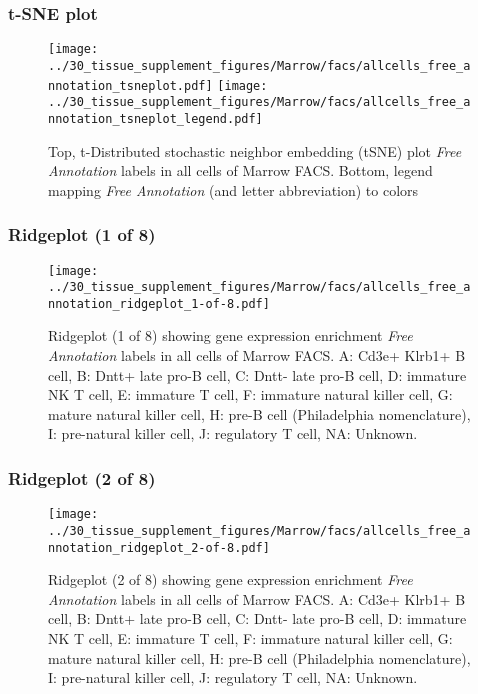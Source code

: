 \clearpage
\subsubsection{t-SNE plot}
\begin{figure}[h]
\centering
\texttt{[image: ../30\_tissue\_supplement\_figures/Marrow/facs/allcells\_free\_annotation\_tsneplot.pdf]}
\texttt{[image: ../30\_tissue\_supplement\_figures/Marrow/facs/allcells\_free\_annotation\_tsneplot\_legend.pdf]}
\caption{Top, t-Distributed stochastic neighbor embedding (tSNE) plot  \emph{Free Annotation} labels in all cells of Marrow FACS. Bottom, legend mapping \emph{Free Annotation} (and letter abbreviation) to colors}
\end{figure}


\clearpage

\subsubsection{Ridgeplot (1 of 8)}
\begin{figure}[h]
\centering
\texttt{[image: ../30\_tissue\_supplement\_figures/Marrow/facs/allcells\_free\_annotation\_ridgeplot\_1-of-8.pdf]}

\caption{ Ridgeplot (1 of 8)  showing gene expression enrichment \emph{Free Annotation} labels in all cells of Marrow FACS. A: Cd3e+ Klrb1+ B cell, B: Dntt+ late pro-B cell, C: Dntt- late pro-B cell, D: immature NK T cell, E: immature T cell, F: immature natural killer cell, G: mature natural killer cell, H: pre-B cell (Philadelphia nomenclature), I: pre-natural killer cell, J: regulatory T cell, NA: Unknown.}
\end{figure}


\clearpage

\subsubsection{Ridgeplot (2 of 8)}
\begin{figure}[h]
\centering
\texttt{[image: ../30\_tissue\_supplement\_figures/Marrow/facs/allcells\_free\_annotation\_ridgeplot\_2-of-8.pdf]}

\caption{ Ridgeplot (2 of 8)  showing gene expression enrichment \emph{Free Annotation} labels in all cells of Marrow FACS. A: Cd3e+ Klrb1+ B cell, B: Dntt+ late pro-B cell, C: Dntt- late pro-B cell, D: immature NK T cell, E: immature T cell, F: immature natural killer cell, G: mature natural killer cell, H: pre-B cell (Philadelphia nomenclature), I: pre-natural killer cell, J: regulatory T cell, NA: Unknown.}
\end{figure}


